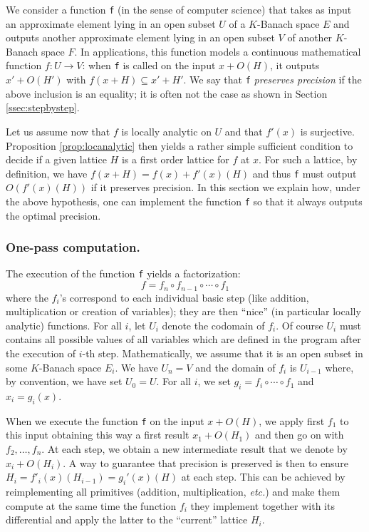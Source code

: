 \documentclass{lms}
\begin{document}
We consider a function {\tt f} (in the sense of computer 
science) that takes as input an approximate element lying in an open 
subset $U$ of a $K$-Banach space $E$ and outputs another approximate
element lying in an open subset $V$ of another $K$-Banach space $F$.
In applications, this function models a continuous
mathematical function $f : U \to V$: when 
{\tt f} is called on the input $x + O(H)$, it outputs $x' + O(H')$ with 
$f(x+H) \subseteq x' + H'$. We say that {\tt f} \emph{preserves precision}
if the above inclusion is an equality; it is 
often not the case as shown in Section \ref{ssec:stepbystep}.

Let us assume now that $f$ is locally analytic on $U$ and
that $f'(x)$ is surjective. Proposition \ref{prop:locanalytic} then 
yields a rather simple sufficient condition to decide if a given lattice 
$H$ is a first order lattice for $f$ at $x$. For such a lattice, by 
definition, we have $f(x+H) = f(x) + f'(x)(H)$ and thus {\tt f}
must output $O(f'(x)(H))$ if it preserves precision. In this section we
explain how, under the above hypothesis, one can implement the function 
{\tt f} so that it always outputs the optimal precision.

\subsubsection*{One-pass computation.}

The execution of the function {\tt f} yields a factorization:
$$f = f_n \circ f_{n-1} \circ \cdots \circ f_1$$
where the $f_i$'s correspond to each individual basic step (like 
addition, multiplication or creation of variables); they are then
``nice'' (in particular locally analytic) functions. For all 
$i$, let $U_i$ denote the codomain of $f_i$. Of course $U_i$ must
contains all possible values of all variables which are defined in the 
program after the execution of $i$-th step. Mathematically, we assume
that it is an 
open subset in some $K$-Banach space $E_i$. We have $U_n = V$ and the 
domain of $f_i$ is $U_{i-1}$ where, by convention, we have set $U_0 = 
U$.
For all $i$, we set $g_i = f_i \circ \cdots \circ f_1$ and $x_i = 
g_i(x)$. 

When we execute the function {\tt f} on the input $x + O(H)$, we apply 
first $f_1$ to this input obtaining this way a first result $x_1 + 
O(H_1)$ and then go on with $f_2, \ldots, f_n$. At each step, we obtain 
a new intermediate result that we denote by $x_i + O(H_i)$. A way to 
guarantee that precision is preserved is then to 
ensure $H_i = f'_i(x)(H_{i-1}) = g_i'(x)(H)$ at each step. This can be 
achieved by reimplementing all primitives (addition, multiplication, 
\emph{etc.}) and make them compute at the same time the function $f_i$
they implement together with its differential and apply the latter to
the ``current'' lattice $H_i$.
\end{document}
